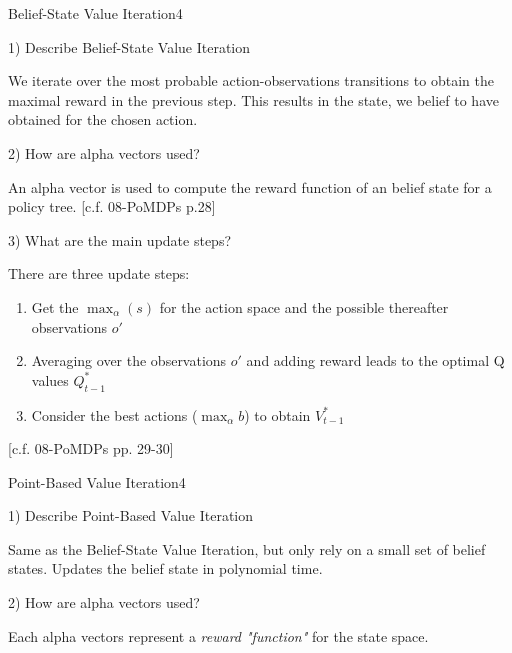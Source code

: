 \begin{questions}
\begin{question}{Belief-State Value Iteration}{4}
	
	1) Describe Belief-State Value Iteration
	\begin{answer}
		
		We iterate over the most probable action-observations transitions to obtain the maximal reward in the previous step. This results in the state, we belief to have obtained for the chosen action.
	\end{answer}
	
	2) How are alpha vectors used?
	\begin{answer}
		
		An alpha vector is used to compute the reward function of an belief state for a policy tree.
		[c.f. 08-PoMDPs p.28]
	\end{answer}
	
	3) What are the main update steps?
	\begin{answer}
		
		There are three update steps:
		\begin{enumerate}
			\item Get the $\max_\alpha (s)$ for the action space and the possible thereafter observations $o'$
			\item Averaging over the observations $o'$ and adding reward leads to the optimal Q values $Q_{t-1}^*$
			\item Consider the best actions ($\max_\alpha b$) to obtain $V_{t-1}^*$
		\end{enumerate}
		[c.f. 08-PoMDPs pp. 29-30]
	\end{answer}
\end{question}


\begin{question}{Point-Based Value Iteration}{4}
	
	1) Describe Point-Based Value Iteration
	\begin{answer}
		
		Same as the Belief-State Value Iteration, but only rely on a small set of belief states.
		Updates the belief state in polynomial time. 
	\end{answer}
	
	2) How are alpha vectors used?
	\begin{answer}
		
		Each alpha vectors represent a \textit{reward "function"} for the state space.
	\end{answer}
	

\end{question}
\end{questions}
